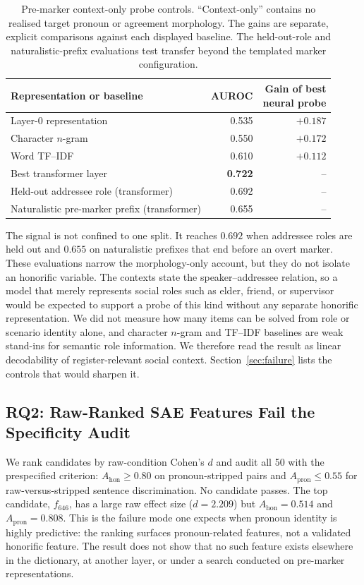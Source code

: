 \documentclass[11pt]{article}
\begin{document}
\begin{table}[t]
\centering
\scriptsize
\setlength\tabcolsep{2pt}
\begin{tabular}{p{2.75cm}rr}
\toprule
\textbf{Representation or baseline} & \textbf{AUROC} & \shortstack{\textbf{Gain of best}\\\textbf{neural probe}} \\
\midrule
Layer-0 representation & 0.535 & $+0.187$ \\
Character $n$-gram & 0.550 & $+0.172$ \\
Word TF--IDF & 0.610 & $+0.112$ \\
Best transformer layer & \textbf{0.722} & -- \\
\midrule
Held-out addressee role (transformer) & 0.692 & -- \\
Naturalistic pre-marker prefix (transformer) & 0.655 & -- \\
\bottomrule
\end{tabular}
\caption{Pre-marker context-only probe controls. ``Context-only'' contains no
realised target pronoun or agreement morphology. The gains are separate,
explicit comparisons against each displayed baseline. The held-out-role and
naturalistic-prefix evaluations test transfer beyond the templated marker
configuration.}
\label{tab:context-probe}
\end{table}

The signal is not confined to one split. It reaches $0.692$ when addressee roles
are held out and $0.655$ on naturalistic prefixes that end before an overt
marker. These evaluations narrow the morphology-only account, but they do not
isolate an honorific variable. The contexts state the speaker--addressee
relation, so a model that merely represents social roles such as elder, friend,
or supervisor would be expected to support a probe of this kind without any
separate honorific representation. We did not measure how many items can be
solved from role or scenario identity alone, and character $n$-gram and TF--IDF
baselines are weak stand-ins for semantic role information. We therefore read
the result as linear decodability of register-relevant social context.
Section~\ref{sec:failure} lists the controls that would sharpen it.

\subsection{RQ2: Raw-Ranked SAE Features Fail the Specificity Audit}
\label{sec:rq2-results}

We rank candidates by raw-condition Cohen's $d$ and audit all 50 with the
prespecified criterion: $A_{\mathrm{hon}}\geq0.80$ on pronoun-stripped pairs and
$A_{\mathrm{pron}}\leq0.55$ for raw-versus-stripped sentence discrimination.
No candidate passes. The top candidate, $f_{646}$, has a large raw effect size
($d=2.209$) but $A_{\mathrm{hon}}=0.514$ and $A_{\mathrm{pron}}=0.808$.
This is the failure mode one expects when pronoun identity is highly
predictive: the ranking surfaces pronoun-related features, not a validated
honorific feature. The result does not show that no such feature exists
elsewhere in the dictionary, at another layer, or under a search conducted on
pre-marker representations.
\end{document}
